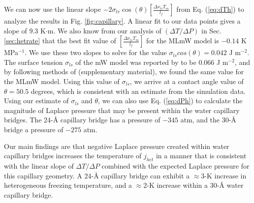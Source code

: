 \documentclass[journal abbreviation, manuscript]{copernicus}
\begin{document}


We can now use the linear slope $-2 \sigma_{lv}\cos(\theta) \left[\frac{\Delta \nu_{ls} T_m }{l_f}\right]$ from Eq. (\ref{eq:dTh}) to analyze the results in Fig. \ref{fig:capillary}. A linear fit to our data points gives a slope of $9.3$ K$\cdot$m. We also know from our analysis of $(\Delta T/\Delta P)$ in Sec. \ref{sec:hetrate} that the best fit value of $\left[\frac{\Delta \nu_{ls} T_m }{l_f}\right]$ for the MLmW model is $-0.14$ K MPa$^{-1}$. We use these two slopes to solve for the value $\sigma_{ls} cos(\theta) = 0.042$ J m$^{-2}$. The surface tension $\sigma_{ls}$ of the mW model was reported by \citet{molinero2009} to be $0.066$ J m$^{-2}$, and by following methods of \citet{li2009surface} (supplementary material), we found the same value for the MLmW model. Using this value of $\sigma_{ls}$, we arrive at a contact angle value of $\theta = 50.5$ degrees, which is consistent with an estimate from the simulation data. Using our estimate of $\sigma_{ls}$ and $\theta$, we can also use Eq. (\ref{eq:dPh}) to calculate the magnitude of Laplace pressure that may be present within the water capillary bridges. The 24-\AA{} capillary bridge has a pressure of $-345$ atm, and the 30-\AA{} bridge a pressure of $-275$ atm.

Our main findings are that negative Laplace pressure created within water capillary bridges increases the temperature of $j_{het}$ in a manner that is consistent with the linear slope of $\Delta T/\Delta P$ combined with the expected Laplace pressure for this capillary geometry. A 24-\AA{} capillary bridge can exhibit a $\approx 3$-K increase in heterogeneous freezing temperature, and a $\approx 2$-K increase within a 30-\AA{} water capillary bridge.
\end{document}
